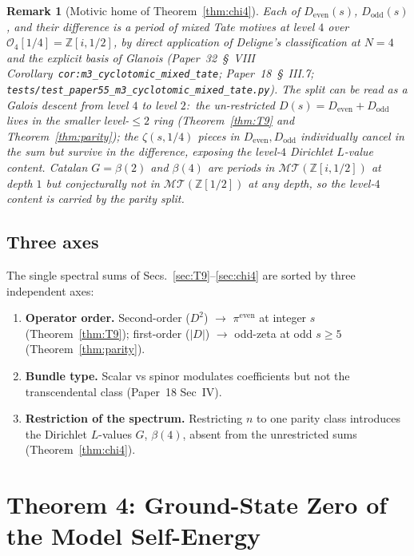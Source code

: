 \documentclass[11pt]{article}
\newtheorem{remark}{Remark}
\begin{document}
\begin{remark}[Motivic home of Theorem~\ref{thm:chi4}]
\label{rem:chi4_motivic}
Each of $D_{\mathrm{even}}(s)$, $D_{\mathrm{odd}}(s)$, and their
difference is a period of mixed Tate motives at level $4$ over
$\mathcal{O}_4[1/4] = \mathbb{Z}[i, 1/2]$, by direct application of
Deligne's classification at $N = 4$ and the explicit basis of
Glanois (Paper~32~\S~VIII Corollary~\texttt{cor:m3\_cyclotomic\_mixed\_tate};
Paper~18~\S~III.7; \texttt{tests/test\_paper55\_m3\_cyclotomic\_mixed\_tate.py}).
The split can be read as a Galois descent from level $4$ to level $2$:\
the un-restricted
$D(s) = D_{\mathrm{even}} + D_{\mathrm{odd}}$ lives in the smaller
level-$\le 2$ ring (Theorem~\ref{thm:T9} and
Theorem~\ref{thm:parity}); the $\zeta(s, 1/4)$ pieces in
$D_{\mathrm{even}}, D_{\mathrm{odd}}$ individually cancel in the
sum but survive in the difference, exposing the level-$4$ Dirichlet
$L$-value content.  Catalan $G = \beta(2)$ and $\beta(4)$ are
periods in $\mathcal{MT}(\mathbb{Z}[i, 1/2])$ at depth $1$ but
conjecturally not in $\mathcal{MT}(\mathbb{Z}[1/2])$ at any
depth, so the level-$4$ content is carried by the parity split.
\end{remark}

\subsection{Three axes}

The single spectral sums of Secs.~\ref{sec:T9}--\ref{sec:chi4} are
sorted by three independent axes:
\begin{enumerate}
\item \textbf{Operator order.}
      Second-order ($D^2$) $\to$ $\pi^{\mathrm{even}}$ at integer $s$ (Theorem~\ref{thm:T9});
      first-order ($|D|$) $\to$ odd-zeta at odd $s \ge 5$ (Theorem~\ref{thm:parity}).
\item \textbf{Bundle type.}
      Scalar vs spinor modulates coefficients but not the
      transcendental class (Paper~18 Sec~IV).
\item \textbf{Restriction of the spectrum.}
      Restricting $n$ to one parity class introduces the Dirichlet
      $L$-values $G$, $\beta(4)$, absent from the unrestricted sums
      (Theorem~\ref{thm:chi4}).
\end{enumerate}

\section{Theorem 4: Ground-State Zero of the Model Self-Energy}
\label{sec:self_energy}
\end{document}

